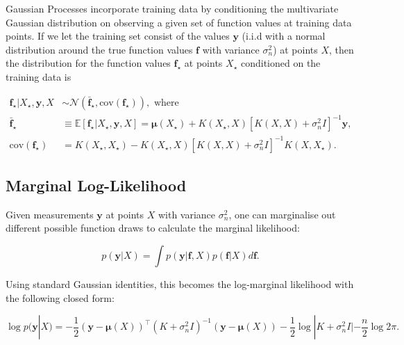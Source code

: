 \documentclass{article}
\begin{document}
            Gaussian Processes incorporate training data by conditioning the multivariate Gaussian distribution on observing a given set of function values at training data points. If we let the training set consist of the values $\boldsymbol{y}$ (i.i.d with a normal distribution around the true function values $\boldsymbol{f}$ with variance $\sigma_n^2$) at points $X$, then the distribution for the function values $\boldsymbol{f}_\star$ at points $X_\star$ conditioned on the training data is 

            \begin{align}
                \boldsymbol{f}_\star | X_\star, \boldsymbol{y}, X &\sim \mathcal{N}(\boldsymbol{\bar{f}}_\star, \textrm{cov}(\boldsymbol{f}_\star)), \textrm{ where} \\
                \boldsymbol{\bar{f}}_\star &\equiv  \mathbb{E}[\boldsymbol{f}_\star | X_\star, \boldsymbol{y}, X] = \boldsymbol{\mu}(X_\star) + K(X_\star, X)[K(X, X) + \sigma_n^2I]^{-1}\boldsymbol{y}, \\ 
                \textrm{cov}(\boldsymbol{f}_\star) &= K(X_\star, X_\star) - K(X_\star, X)[K(X, X) + \sigma_n^2I]^{-1}K(X, X_\star).
            \end{align}
           
        \subsection{Marginal Log-Likelihood}

            Given measurements $\boldsymbol{y}$ at points $X$ with variance $\sigma_n^2$, one can marginalise out different possible function draws to calculate the marginal likelihood:

            \begin{equation}
                p(\boldsymbol{y}|X) = \int p(\boldsymbol{y}|\boldsymbol{f}, X)p(\boldsymbol{f}|X)d\boldsymbol{f}.
            \end{equation}

            Using standard Gaussian identities, this becomes the log-marginal likelihood with the following closed form:

            \begin{equation}
                \log p(\boldsymbol{y}|X) = -\frac{1}{2}(\boldsymbol{y}-\boldsymbol{\mu}(X))^\top (K + \sigma_n^2I)^{-1} (\boldsymbol{y}-\boldsymbol{\mu}(X)) - \frac{1}{2}\log |K + \sigma_n^2I| - \frac{n}{2}\log2\pi.
            \end{equation} 
\end{document}
